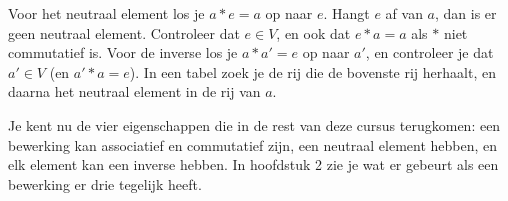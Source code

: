 \begin{werkwijze}
Voor het neutraal element los je $a \ast e = a$ op naar $e$. Hangt $e$ af van $a$, dan is er geen neutraal element. Controleer dat $e \in V$, en ook dat $e \ast a = a$ als $\ast$ niet commutatief is. Voor de inverse los je $a \ast a' = e$ op naar $a'$, en controleer je dat $a' \in V$ (en $a' \ast a = e$). In een tabel zoek je de rij die de bovenste rij herhaalt, en daarna het neutraal element in de rij van $a$.
\end{werkwijze}


\begin{oefeningen}
\end{oefeningen}

Je kent nu de vier eigenschappen die in de rest van deze cursus terugkomen: een bewerking kan associatief en commutatief zijn, een neutraal element hebben, en elk element kan een inverse hebben. In hoofdstuk 2 zie je wat er gebeurt als een bewerking er drie tegelijk heeft.

\opdrachtenkop

\begin{oefeningen}















\end{oefeningen}


